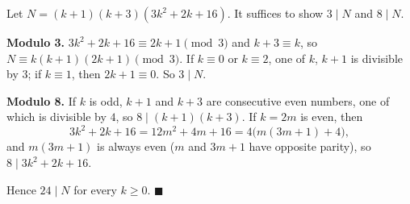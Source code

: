 Let $N=(k+1)(k+3)(3k^2+2k+16)$. It suffices to show $3\mid N$ and $8\mid N$.

\textbf{Modulo 3.} $3k^2+2k+16\equiv2k+1\pmod3$ and $k+3\equiv k$, so $N\equiv k(k+1)(2k+1)\pmod3$. If $k\equiv0$ or $k\equiv2$, one of $k$, $k+1$ is divisible by $3$; if $k\equiv1$, then $2k+1\equiv0$. So $3\mid N$.

\textbf{Modulo 8.} If $k$ is odd, $k+1$ and $k+3$ are consecutive even numbers, one of which is divisible by $4$, so $8\mid(k+1)(k+3)$. If $k=2m$ is even, then
\[3k^2+2k+16=12m^2+4m+16=4\bigl(m(3m+1)+4\bigr),\]
and $m(3m+1)$ is always even ($m$ and $3m+1$ have opposite parity), so $8\mid3k^2+2k+16$.

Hence $24\mid N$ for every $k\ge0$. $\blacksquare$
